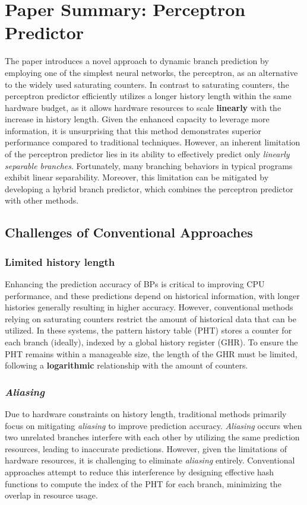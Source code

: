 \documentclass{article}
\begin{document}
\section{Paper Summary: Perceptron Predictor}\label{4}
The paper introduces a novel approach to dynamic branch prediction by employing one of the simplest neural networks, the perceptron, as an alternative to the widely used saturating counters. In contrast to saturating counters, the perceptron predictor efficiently utilizes a longer history length within the same hardware budget, as it allows hardware resources to scale\textbf{ linearly} with the increase in history length. Given the enhanced capacity to leverage more information, it is unsurprising that this method demonstrates superior performance compared to traditional techniques. However, an inherent limitation of the perceptron predictor lies in its ability to effectively predict only\textit{ linearly separable branches}. Fortunately, many branching behaviors in typical programs exhibit linear separability. Moreover, this limitation can be mitigated by developing a hybrid branch predictor, which combines the perceptron predictor with other methods.

\subsection{Challenges of Conventional Approaches}
\subsubsection{Limited history length}\label{Section 4.1.1}
Enhancing the prediction accuracy of BPs is critical to improving CPU performance, and these predictions depend on historical information, with longer histories generally resulting in higher accuracy. However, conventional methods relying on saturating counters restrict the amount of historical data that can be utilized. In these systems, the pattern history table (PHT) stores a counter for each branch (ideally), indexed by a global history register (GHR). To ensure the PHT remains within a manageable size, the length of the GHR must be limited, following a \textbf{logarithmic} relationship with the amount of counters.

\subsubsection{\textit{Aliasing}}
Due to hardware constraints on history length, traditional methods primarily focus on mitigating \textit{aliasing} to improve prediction accuracy. \textit{Aliasing} occurs when two unrelated branches interfere with each other by utilizing the same prediction resources, leading to inaccurate predictions. However, given the limitations of hardware resources, it is challenging to eliminate \textit{aliasing} entirely. Conventional approaches attempt to reduce this interference by designing effective hash functions to compute the index of the PHT for each branch, minimizing the overlap in resource usage.
\end{document}
